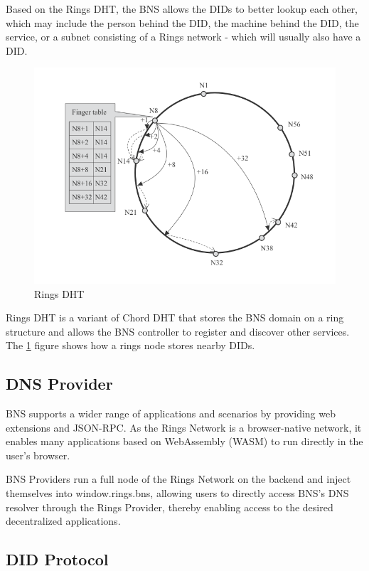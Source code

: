 \documentclass[twocolumn]{article}
\begin{document}
Based on the Rings DHT, the BNS allows the DIDs to better lookup each other, which may include the person behind the DID, the machine behind the DID, the service, or a subnet consisting of a Rings network - which will usually also have a DID.
\begin{figure}[htbp]
  \includegraphics[width=\linewidth]{imgs/chord.png}
  \caption{Rings DHT}
  \label{chord}

  \end{figure}

Rings DHT is a variant of Chord DHT that stores the BNS domain on a ring structure and allows the BNS controller to register and discover other services. The \ref{chord} figure shows how a rings node stores nearby DIDs.


\subsection{DNS Provider}
BNS supports a wider range of applications and scenarios by providing web extensions and JSON-RPC. As the Rings Network is a browser-native network, it enables many applications based on WebAssembly (WASM) to run directly in the user's browser.

BNS Providers run a full node of the Rings Network on the backend and inject themselves into window.rings.bns, allowing users to directly access BNS's DNS resolver through the Rings Provider, thereby enabling access to the desired decentralized applications.
\subsection{DID Protocol}
\end{document}
